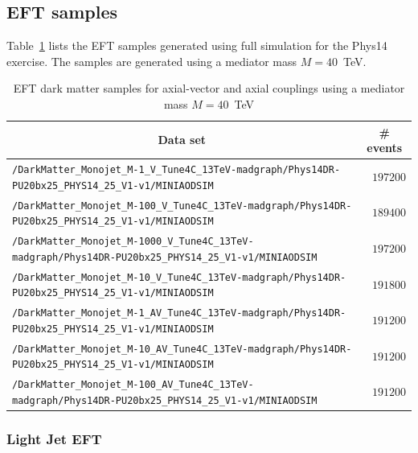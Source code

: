 \subsection{EFT samples}
Table~\ref{tab:datasets_dm} lists the EFT samples generated using full simulation for the Phys14 exercise. The samples are generated using a mediator mass $M=40$~TeV.
\begin{table}
    \centering
    \caption{EFT dark matter samples for axial-vector and axial couplings using a mediator mass $M=40$~TeV \label{tab:datasets_dm}}
    \begin{tabular}{lr}
      \hline\hline
      \multicolumn{1}{c}{Data set}&\multicolumn{1}{c}{\# events}\tabularnewline
      \hline
      {\footnotesize \verb!/DarkMatter_Monojet_M-1_V_Tune4C_13TeV-madgraph/Phys14DR-PU20bx25_PHYS14_25_V1-v1/MINIAODSIM!   } &$197200$\tabularnewline
      {\footnotesize \verb!/DarkMatter_Monojet_M-100_V_Tune4C_13TeV-madgraph/Phys14DR-PU20bx25_PHYS14_25_V1-v1/MINIAODSIM! } &$189400$\tabularnewline
      {\footnotesize \verb!/DarkMatter_Monojet_M-1000_V_Tune4C_13TeV-madgraph/Phys14DR-PU20bx25_PHYS14_25_V1-v1/MINIAODSIM!} &$197200$\tabularnewline
      {\footnotesize \verb!/DarkMatter_Monojet_M-10_V_Tune4C_13TeV-madgraph/Phys14DR-PU20bx25_PHYS14_25_V1-v1/MINIAODSIM!  } &$191800$\tabularnewline
      {\footnotesize \verb!/DarkMatter_Monojet_M-1_AV_Tune4C_13TeV-madgraph/Phys14DR-PU20bx25_PHYS14_25_V1-v1/MINIAODSIM!  } &$191200$\tabularnewline
      {\footnotesize \verb!/DarkMatter_Monojet_M-10_AV_Tune4C_13TeV-madgraph/Phys14DR-PU20bx25_PHYS14_25_V1-v1/MINIAODSIM! } &$191200$\tabularnewline
      {\footnotesize \verb!/DarkMatter_Monojet_M-100_AV_Tune4C_13TeV-madgraph/Phys14DR-PU20bx25_PHYS14_25_V1-v1/MINIAODSIM!} &$191200$\tabularnewline
\hline
\end{tabular}
\end{table}


\subsubsection{Light Jet EFT}

